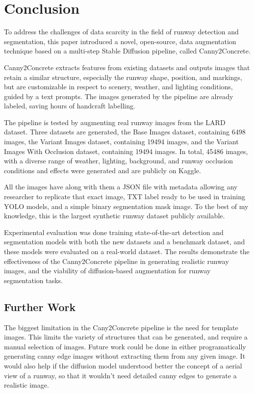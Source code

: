 \chapter{Conclusion}

To address the challenges of data scarcity in the field of runway detection and segmentation,
this paper introduced a novel, open-source, data augmentation technique based on a multi-step
Stable Diffusion pipeline, called Canny2Concrete.

Canny2Concrete extracts features from existing datasets and outputs images
that retain a similar structure, especially the runway shape, position, and markings, but are
customizable in respect to scenery, weather, and lighting conditions, guided by
a text prompts. The images generated by the pipeline are already
labeled, saving hours of handcraft labelling.

The pipeline is tested by augmenting real runway images from the LARD \cite{ducoffe_lard_2023}
dataset. Three datasets are generated, the Base Images dataset,
containing 6498 images, the Variant Images dataset, containing 19494 images, and
the Variant Images With Occlusion dataset, containing 19494 images. In total,
45486 images, with a diverse range of weather, lighting, background, and runway
occlusion conditions and effects were generated and are publicly on Kaggle.

All the images have along with
them a JSON file
with metadata allowing any researcher to replicate that exact image, TXT label
ready to be used in training YOLO models, and a simple binary segmentation mask
image. To the best of my knowledge, this is the largest synthetic runway
dataset publicly available.

Experimental evaluation was done training state-of-the-art detection and
segmentation models with both the new datasets and a benchmark dataset, and
these models were evaluated on a real-world dataset. The results demonstrate
the effectiveness of the Canny2Concrete pipeline in generating realistic runway
images, and the viability of diffusion-based augmentation for runway segmentation
tasks.

\section{Further Work}

The biggest limitation in the Cany2Concrete pipeline is the need for template
images. This limits the variety of structures that can be generated, and require
a manual selection of images. Future work could be done in either
programatically generating canny edge images without extracting them from any
given image. It would also help if the diffusion model understood better the
concept of a aerial view of a runway, so that it wouldn't need detailed canny
edges to generate a realistic image.


